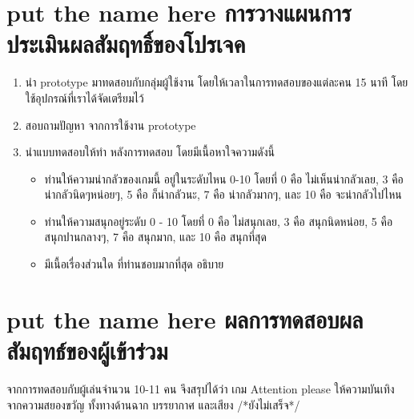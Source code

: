 \section{\ifenglish put the name here \else การวางแผนการประเมินผลสัมฤทธิ์ของโปรเจค\fi}
\begin{enumerate}
    \item นำ prototype มาทดสอบกับกลุ่มผู้ใช้งาน โดยให้เวลาในการทดสอบของแต่ละคน 15 นาที โดยใช้อุปกรณ์ที่เราได้จัดเตรียมไว้
    \item สอบถามปัญหา จากการใช้งาน prototype
    \item นำแบบทดสอบให้ทำ หลังการทดสอบ โดยมีเนื้อหาใจความดังนี้
    \begin{itemize}
        \item ท่านให้ความน่ากลัวของเกมนี้ อยู่ในระดับไหน 0-10 โดยที่ 0 คือ ไม่เห็นน่ากลัวเลย, 3 คือ น่ากลัวนิดๆหน่อยๆ, 5 คือ ก็น่ากลัวนะ, 7 คือ น่ากลัวมากๆ, และ 10 คือ จะน่ากลัวไปไหน
        \item ท่านให้ความสนุกอยู่ระดับ 0 - 10 โดยที่ 0 คือ ไม่สนุกเลย, 3 คือ สนุกนิดหน่อย, 5 คือ สนุกปานกลางๆ, 7 คือ สนุกมาก, และ 10 คือ สนุกที่สุด
        \item มีเนื้อเรื่องส่วนใด ที่ท่านชอบมากที่สุด อธิบาย
    \end{itemize}
\end{enumerate}
\section{\ifenglish put the name here \else ผลการทดสอบผลสัมฤทธ์ของผู้เข้าร่วม\fi}
จากการทดสอบกับผู้เล่นจำนวน 10-11 คน จึงสรุปได้ว่า เกม Attention please ให้ความบันเทิงจากความสยองขวัญ ทั้งทางด้านฉาก บรรยากาศ และเสียง
/*ยังไม่เสร็จ*/

